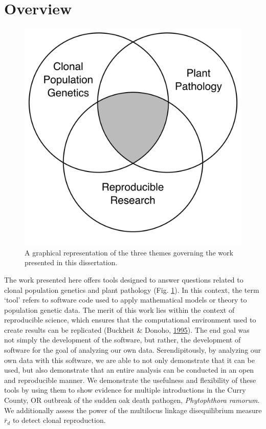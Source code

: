 \documentclass[double,11pt]{beavtex}
\begin{document}
  \section{Overview}\label{overview}
  
  \begin{figure}
  
  {\centering \includegraphics[width=0.5\linewidth]{figure/introduction/dissertation} 
  
  }
  
  \caption[A graphical representation of the three themes governing the work
  presented in this dissertation.]{A graphical representation of the three themes governing the work
  presented in this dissertation.}\label{fig:introduction1}
  \end{figure}
  
  The work presented here offers tools designed to answer questions
  related to clonal population genetics and plant pathology (Fig.
  \ref{fig:introduction1}). In this context, the term `tool' refers to
  software code used to apply mathematical models or theory to population
  genetic data. The merit of this work lies within the context of
  reproducible science, which ensures that the computational environment
  used to create results can be replicated (Buckheit \& Donoho,
  \protect\hyperlink{ref-buckheit1995wavelab}{1995}). The end goal was not
  simply the development of the software, but rather, the development of
  software for the goal of analyzing our own data. Serendipitously, by
  analyzing our own data with this software, we are able to not only
  demonstrate that it can be used, but also demonstrate that an entire
  analysis can be conducted in an open and reproducible manner. We
  demonstrate the usefulness and flexibility of these tools by using them
  to show evidence for multiple introductions in the Curry County, OR
  outbreak of the sudden oak death pathogen, \emph{Phytophthora ramorum}.
  We additionally assess the power of the multilocus linkage
  disequilibrium measure \(\bar{r}_d\) to detect clonal reproduction.
  
\end{document}
